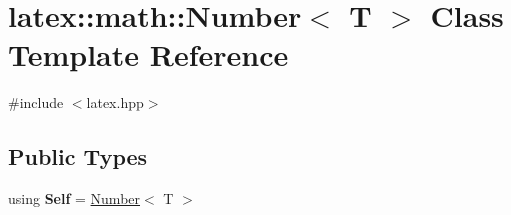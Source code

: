 \hypertarget{classlatex_1_1math_1_1Number}{\section{latex\-:\-:math\-:\-:Number$<$ T $>$ Class Template Reference}
\label{classlatex_1_1math_1_1Number}
}


{\ttfamily \#include $<$latex.\-hpp$>$}

\subsection*{Public Types}
\begin{DoxyCompactItemize}
\item 
\hypertarget{classlatex_1_1math_1_1Number_a0ae5c2f5bd6ad61202cc71f06e8d45b5}{using {\bfseries Self} = \hyperlink{classlatex_1_1math_1_1Number}{Number}$<$ T $>$}\label{classlatex_1_1math_1_1Number_a0ae5c2f5bd6ad61202cc71f06e8d45b5}

\end{DoxyCompactItemize}
